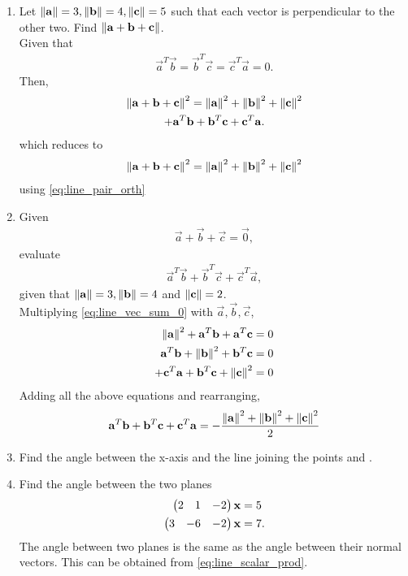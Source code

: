 \documentclass[journal,12pt,twocolumn]{IEEEtran}
\renewcommand\thesection{\arabic{section}}
\begin{document}
\begin{enumerate}[label=\thesection.\arabic*.,ref=\thesection.\theenumi]
\item Let $\left\lVert\mathbf{a}\right\rVert = 3, \left\lVert\mathbf{b}\right\rVert= 4, \left\lVert\mathbf{c}\right\rVert = 5$ such that each vector is perpendicular to the other two.  Find $\left\lVert\mathbf{a}+\mathbf{b}+\mathbf{c}\right\rVert$.
%
\\
\solution Given that 
%
\begin{align}
\label{eq:line_pair_orth}
 \vec{a}^T \vec{b} =  \vec{b}^T\vec{c}= \vec{c}^T\vec{a} = 0.
\end{align}
%
Then, 
%
\begin{multline}
\left\lVert\mathbf{a}+\mathbf{b}+\mathbf{c}\right\rVert^2 = \left\lVert\mathbf{a}\right\rVert^2+\left\lVert\mathbf{b}\right\rVert^2+\left\lVert\mathbf{c}\right\rVert^2
\\
+ \mathbf{a}^T \mathbf{b} +  \mathbf{b}^T\mathbf{c}+ \mathbf{c}^T\mathbf{a}.
\end{multline}
%
which reduces to 
%
\begin{align}
\left\lVert\mathbf{a}+\mathbf{b}+\mathbf{c}\right\rVert^2 = \left\lVert\mathbf{a}\right\rVert^2+\left\lVert\mathbf{b}\right\rVert^2+\left\lVert\mathbf{c}\right\rVert^2
\end{align}
%
using \eqref{eq:line_pair_orth}
%
\item Given 
\begin{align}
\label{eq:line_vec_sum_0}
 \vec{a}+\vec{b}+\vec{c} = \vec{0}, 
\end{align}
evaluate 
\begin{align}
 \vec{a}^T\vec{b}+\vec{b}^T\vec{c}+\vec{c}^T\vec{a},
\end{align}
given that $\left\lVert \mathbf{a}\right\rVert=3, \left\lVert \mathbf{b}\right\rVert= 4$ and $\left\lVert \mathbf{c}\right\rVert = 2 $.
%
\\
\solution Multiplying \eqref{eq:line_vec_sum_0} with $\vec{a}, \vec{b}, \vec{c}$,
\begin{align}
\left\lVert \mathbf{a}\right\rVert^2+\mathbf{a}^T\mathbf{b}+\mathbf{a}^T\mathbf{c} &= 0
\\
\mathbf{a}^T\mathbf{b}+\left\lVert \mathbf{b}\right\rVert^2+\mathbf{b}^T\mathbf{c} &= 0
\\
+\mathbf{c}^T\mathbf{a}+\mathbf{b}^T\mathbf{c}+\left\lVert \mathbf{c}\right\rVert^2 &= 0
\end{align}
%
Adding all the above equations and rearranging,
\begin{multline}
 \mathbf{a}^T\mathbf{b}+\mathbf{b}^T\mathbf{c}+\mathbf{c}^T\mathbf{a} = -\frac{\left\lVert \mathbf{a}\right\rVert^2+\left\lVert \mathbf{b}\right\rVert^2+\left\lVert \mathbf{c}\right\rVert^2}{2}
\end{multline}
\item Find the angle between the x-axis and the line joining the points  and .
\solution
\item Find the angle between the two planes
\label{prob:planes_angle}
\begin{align}
\begin{pmatrix}2 & 1 & -2\end{pmatrix}\mathbf{x}&=5
\\
\begin{pmatrix}3 &-6 & -2\end{pmatrix}\mathbf{x}&=7.
\end{align}
%
\solution The angle between two planes is the same as the angle between their normal vectors.  This can be obtained from \eqref{eq:line_scalar_prod}.


\end{enumerate}
\end{document}
